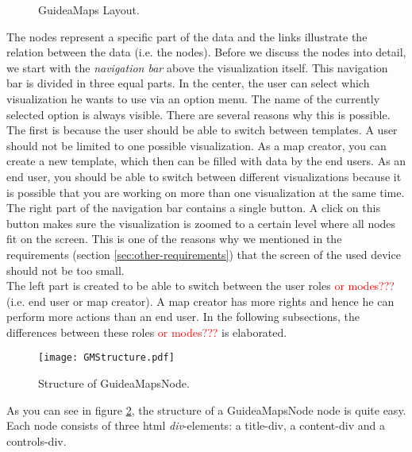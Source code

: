 \begin{figure}[H]
	\centering
	\caption{GuideaMaps Layout.}
	\label{fig:guideamaps}
\end{figure}

The nodes represent a specific part of the data and the links illustrate the relation between the data (i.e. the nodes). Before we discuss the nodes into detail, we start with the \textit{navigation bar} above the visualization itself. This navigation bar is divided in three equal parts. In the center, the user can select which visualization he wants to use via an option menu. The name of the currently selected option is always visible. There are several reasons why this is possible. The first is because the user should be able to switch between templates. A user should not be limited to one possible visualization. As a map creator, you can create a new template, which then can be filled with data by the end users. As an end user, you should be able to switch between different visualizations because it is possible that you are working on more than one visualization at the same time.\\

The right part of the navigation bar contains a single button. A click on this button makes sure the visualization is zoomed to a certain level where all nodes fit on the screen. This is one of the reasons why we mentioned in the requirements (section \ref{sec:other-requirements}) that the screen of the used device should not be too small.\\

The left part is created to be able to switch between the user roles \textcolor{red}{or modes???} (i.e. end user or map creator). A map creator has more rights and hence he can perform more actions than an end user. In the following subsections, the differences between these roles \textcolor{red}{or modes???} is elaborated.

\begin{figure}[H]
	\centering
	\texttt{[image: GMStructure.pdf]}
	\caption{Structure of GuideaMapsNode.}
	\label{fig:gmnodestructure}
\end{figure}

As you can see in figure \ref{fig:gmnodestructure}, the structure of a GuideaMapsNode node is quite easy. Each node consists of three html \textit{div}-elements: a title-div, a content-div and a controls-div.

